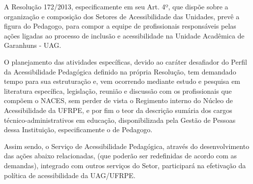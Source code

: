 \documentclass[
	12pt,				%
	openright,			%
  oneside,     %
	a4paper,			%
 hyphens,
	chapter=TITLE,		%
	english,			%
	french,				%
	spanish,			%
	brazil				%
	]{abntex2}
\begin{document}
A Resolução 172/2013, especificamente em seu Art. 4º, que dispõe sobre a organização e composição dos Setores de Acessibilidade das Unidades, prevê a figura do Pedagogo, para compor a equipe de profissionais responsáveis pelas ações ligadas ao processo de inclusão e acessibilidade na Unidade Acadêmica de Garanhuns - UAG.

O planejamento das atividades específicas, devido ao caráter desafiador do Perfil da Acessibilidade Pedagógica definido na própria Resolução, tem demandado tempo para sua estruturação e, vem ocorrendo mediante estudo e pesquisa em literatura específica, legislação, reunião e discussão com os profissionais que compõem o NACES, sem perder de vista o Regimento interno do Núcleo de Acessibilidade da UFRPE, e por fim o teor da descrição sumária dos cargos técnico-administrativos em educação, disponibilizada pela Gestão de Pessoas dessa Instituição, especificamente o de Pedagogo.

Assim sendo, o Serviço de Acessibilidade Pedagógica, através do desenvolvimento das ações abaixo relacionadas, (que poderão ser redefinidas de acordo com as demandas), integrado com outros serviços do Setor, participará na efetivação da política de acessibilidade da UAG/UFRPE.
\end{document}
